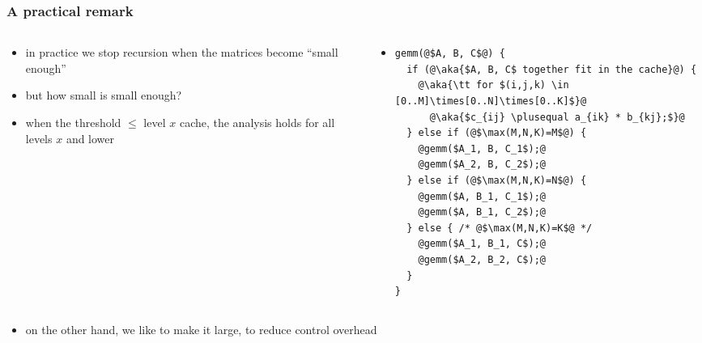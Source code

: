 \documentclass[12pt,dvipdfmx]{beamer}
\newcommand{\plusequal}{\mbox{\tt\ += }}
\newcommand{\aka}[1]{{\color{red}#1}}
\begin{document}
\begin{frame}[fragile]
\frametitle{A practical remark}

\begin{columns}[t]
\begin{column}{0.45\textwidth}
\begin{itemize}
\item<1-> in practice we stop recursion when the 
  matrices become ``small enough''

\item<2-> but how small is small enough? 

\item<3-> when the threshold $\leq$ level $x$ cache,
  the analysis holds for all levels $x$ and lower
\end{itemize}
\end{column}

\begin{column}{0.55\textwidth}
  \begin{itemize}
  \item []
\begin{lstlisting}[basicstyle=\scriptsize]
gemm(@$A, B, C$@) {
  if (@\aka{$A, B, C$ together fit in the cache}@) {
    @\aka{\tt for $(i,j,k) \in [0..M]\times[0..N]\times[0..K]$}@
      @\aka{$c_{ij} \plusequal a_{ik} * b_{kj};$}@
  } else if (@$\max(M,N,K)=M$@) {
    @gemm($A_1, B, C_1$);@
    @gemm($A_2, B, C_2$);@
  } else if (@$\max(M,N,K)=N$@) {
    @gemm($A, B_1, C_1$);@
    @gemm($A, B_1, C_2$);@
  } else { /* @$\max(M,N,K)=K$@ */
    @gemm($A_1, B_1, C$);@
    @gemm($A_2, B_2, C$);@
  }
}
\end{lstlisting}
  \end{itemize}
\end{column}
\end{columns}

\begin{itemize}
\item<4-> on the other hand, we like to make it large, 
  to reduce control overhead
\end{itemize}
\end{frame}
\end{document}
